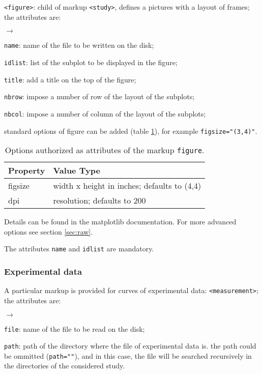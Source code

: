 \documentclass[a4paper,10pt,twoside]{article}
\begin{document}
\texttt{<figure>}: child of markup \texttt{<study>}, defines a pictures
with a layout of frames; the attributes are:
\begin{list}{$\rightarrow$}{}
\item \texttt{name}: name of the file to be written on the disk;
\item \texttt{idlist}: list of the subplot to be displayed in the figure;
\item \texttt{title}: add a title on the top of the figure;
\item \texttt{nbrow}: impose a number of row of the layout of the subplots;
\item \texttt{nbcol}: impose a number of column of the layout of the subplots;
\item standard options of figure can be added (table \ref{table:fig}),
for example \texttt{figsize="(3,4)"}.

\begin{table}[htbp]
\begin{center}
\begin{tabular}{|l|l|}
\hline
\textbf{Property} & \textbf{Value Type} \\
\hline
figsize   & width x height in inches; defaults to (4,4) \\
dpi       & resolution; defaults to 200 \\
\hline
\end{tabular}
\end{center}
\caption{Options authorized as attributes of the markup \texttt{figure}.}
\label{table:fig}
\end{table}

Details can be found in the matplotlib documentation.
For more advanced options see section \ref{sec:raw}.

\end{list}

The attributes \texttt{name} and \texttt{idlist} are mandatory.

\subsubsection{Experimental data}

A particular markup is provided for curves of experimental data:
\texttt{<measurement>}; the attributes are:
\begin{list}{$\rightarrow$}{}
\item \texttt{file}: name of the file to be read on the disk;
\item \texttt{path}: path of the directory where the file of experimental data
is. the path could be ommitted (\texttt{path=""}), and in this case, the file
will be searched recursively in the directories of the considered study.
\end{list}
\end{document}
